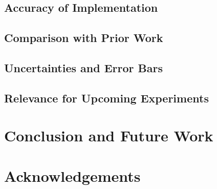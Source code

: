 \documentclass[floats,floatfix,showpacs,amssymb,prd,superscriptaddress,nofootinbib]{revtex4-2} %
\begin{document}
\subsection{Accuracy of Implementation}
\subsection{Comparison with Prior Work}
\subsection{Uncertainties and Error Bars}
\subsection{Relevance for Upcoming Experiments}

\section{Conclusion and Future Work}

\section{Acknowledgements}




\newpage
\nocite{*}
\printbibliography[title={References}]
\end{document}
